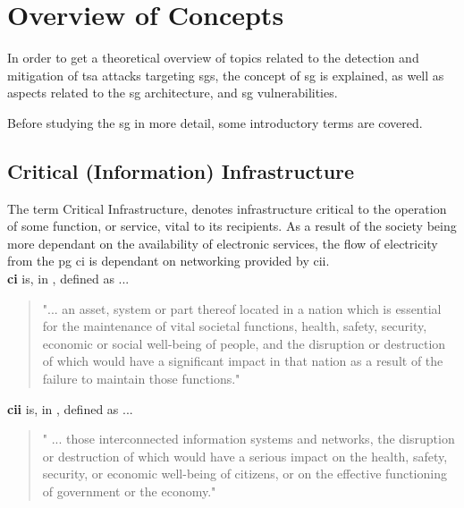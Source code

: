  \chapter{Overview of Concepts} 
 
In order to get a theoretical overview of topics related to the detection and mitigation of \acrlong{tsa} attacks targeting \acrlong{sg}s, the concept of \acrfull{sg} is explained, as well as aspects related to the \acrshort{sg} architecture, and \acrshort{sg} vulnerabilities. 


Before studying the \acrshort{sg} in more detail,  some introductory terms are covered.  



\section{Critical (Information) Infrastructure}

The term Critical Infrastructure, denotes infrastructure critical to the operation of some function, or service, vital to its recipients. As a result of the society being more dependant on the availability of electronic services, the flow of electricity from the \acrshort{pg} \acrfull{ci} is dependant on networking provided by \acrfull{cii}.\\ 

\textbf{\acrfull{ci}} is, in  \cite{luiijf2012understanding}, defined as ... 
 \begin{quote}
"... an asset, system or part thereof located in a
nation which is essential for the maintenance of vital societal functions, health, safety,
security, economic or social well-being of people, and the disruption or destruction of
which would have a significant impact in that nation as a result of the failure to maintain
those functions." \cite[p. 53]{luiijf2012understanding}     
 \end{quote}
 

\textbf{\acrfull{cii}} is, in  \cite{luiijf2012understanding}, defined as ...
 \begin{quote}
" ... those interconnected information
systems and networks, the disruption or destruction of which would have a
serious impact on the health, safety, security, or economic well-being of citizens, or
on the effective functioning of government or the economy." \cite[p. 53]{luiijf2012understanding}     
 \end{quote}


